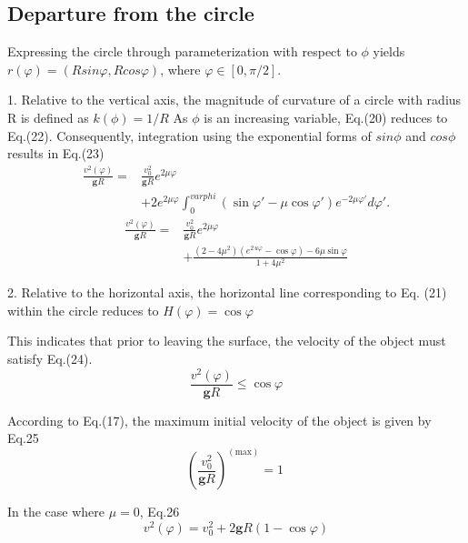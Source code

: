 \documentclass[11pt,letterpaper]{article}
\begin{document}
\subsection{Departure from the circle}
Expressing the circle through parameterization with respect to $\phi$  yields $r(\varphi) = (Rsin\varphi, Rcos\varphi)$, where $\varphi \in [0, \pi/2]. $

1. Relative to the vertical axis, the magnitude of curvature of a circle with radius R is defined as $k(\phi)=1/R$
As $\phi$ is an increasing variable, Eq.(20) reduces to Eq.(22). Consequently, integration using the exponential forms of $sin\phi$ and $cos\phi$ results in Eq.(23)
\begin{equation}
    \begin{split}
        \frac{v^2(\varphi)}{\mathbf g R}= {} & \frac{v_0^2}{\mathbf g R} e^{2\mu\varphi} \\ & + 2 e^{2\mu\varphi} \int_{0}^{varphi} (\sin \varphi' - \mu\cos\varphi') e^{-2\mu\varphi'} d\varphi'.   
    \end{split}
    \tag{22}
\end{equation}
\begin{equation}
    \begin{split}
        \frac{v^2(\varphi)}{\mathbf g R}= {}& \frac{v_0^2}{\mathbf g R}e^{2\mu\varphi} \\ & + \frac{(2-4\mu^2)(e^{2\,u\varphi}-\cos\varphi)-6\mu\sin\varphi}{1+4\mu^2}
    \end{split}
    \tag{23}
\end{equation}

2. Relative to the horizontal axis, the horizontal line corresponding to Eq. (21) within the circle reduces to $H(\varphi)=\cos\varphi$

This indicates that prior to leaving the surface, the velocity of the object must satisfy Eq.(24).
\begin{equation}
    \frac{v^2(\varphi)}{\mathbf g R} \le \cos\varphi
    \tag{24}
\end{equation}

According to Eq.(17), the maximum initial velocity of the object is given by Eq.25
\begin{equation}
    \left(\frac{v_0^2}{\mathbf g R} \right)^{(\text{max})}=1\
    \tag{25}
\end{equation}

In the case where $\mu=0$, Eq.26
\begin{equation}
    v^2(\varphi)=v_0^2 + 2\mathbf g R(1-\cos\varphi)
    \tag{26}
\end{equation}
\end{document}
